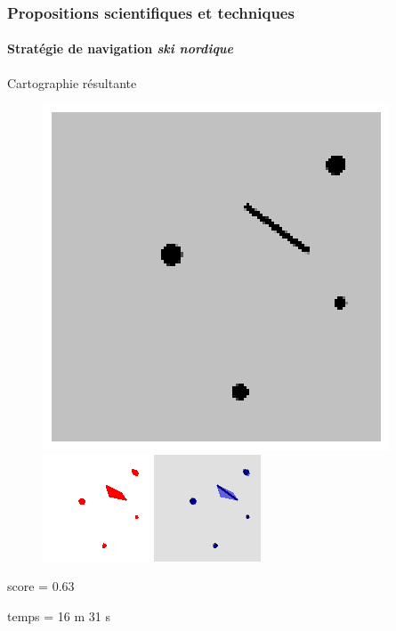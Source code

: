 \documentclass{beamer}
\begin{document}
			\begin{frame}
				\frametitle{Propositions scientifiques et techniques}
				\framesubtitle{Stratégie de navigation \textit{ski nordique}}
				Cartographie résultante
				\begin{figure}
					\centering
					\includegraphics[width=0.3\linewidth]{graphics/test_05_flip.png}
					\includegraphics[width=0.3\linewidth]{graphics/occupancy_grid_example_sn.png}
					\includegraphics[width=0.3\linewidth]{graphics/both_example_sn.png}
				\end{figure}
				score = 0.63

				temps = 16 m 31 s
			\end{frame}
\end{document}
